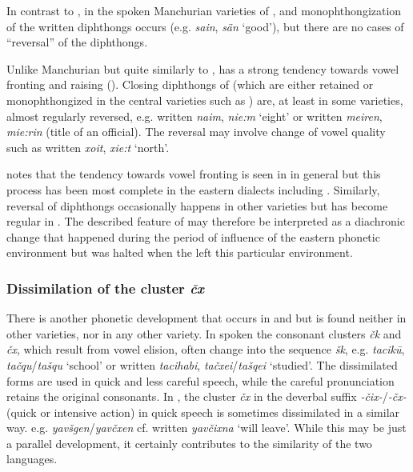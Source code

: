 \documentclass[output=paper,colorlinks,citecolor=brown]{langscibook}
\begin{document}
In contrast to , in the spoken Manchurian varieties of ,  and  monophthongization of the written  diphthongs occurs (e.g.  \textit{sain},  \textit{sän} ‘good’), but there are no cases of “reversal” of the diphthongs.

Unlike Manchurian  but quite similarly to ,  has a strong tendency towards vowel fronting and raising (\citealt[60--61]{Janhunen2012b}). Closing diphthongs of  (which are either retained or monophthongized in the central  varieties such as ) are, at least in some  varieties, almost regularly reversed, e.g. written  \textit{naim},  \textit{nie:m} ‘eight’ or written  \textit{meiren},  \textit{mie:rin} (title of an official). The reversal may involve change of vowel quality such as written  \textit{xoit},  \textit{xie:t} ‘north’.

\citet[45]{Janhunen2012b} notes that the tendency towards vowel fronting is seen in  in general but this process has been most complete in the eastern dialects including . Similarly, reversal of diphthongs occasionally happens in other  varieties but has become regular in . The described feature of  may therefore be interpreted as a diachronic change that happened during the period of influence of the eastern  phonetic environment but was halted when the  left this particular environment.

\subsubsection{Dissimilation of the cluster \textit{čx}}

There is another phonetic development that occurs in  and  but is found neither in other  varieties, nor in any other  variety. In spoken  the consonant clusters \textit{čk} and \textit{čx}, which result from vowel elision, often change into the sequence \textit{šk}, e.g.  \textit{tacikū},  \textit{tačqu}/\textit{tašqu} ‘school’ or written  \textit{tacihabi},  \textit{tačxei}/\textit{tašqei} ‘studied’. The dissimilated forms are used in quick and less careful speech, while the careful pronunciation retains the original consonants. In , the cluster \textit{čx} in the  deverbal suffix \textit{-čix-}/\textit{-čx-} (quick or intensive action) in quick speech is sometimes dissimilated in a similar way. e.g. \textit{yavšgen}/\textit{yavčxen} cf. written  \textit{yavčixna} ‘will leave’. While this may be just a parallel development, it certainly contributes to the similarity of the two languages.
\end{document}
